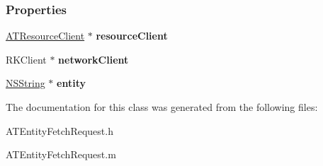 \subsubsection*{Properties}
\begin{DoxyCompactItemize}
\item 
\hypertarget{interface_a_t_entity_fetch_request_a187e3721b09b66577b6d2feba7ec0a4a}{
\hyperlink{interface_a_t_resource_client}{ATResourceClient} $\ast$ {\bfseries resourceClient}}
\label{interface_a_t_entity_fetch_request_a187e3721b09b66577b6d2feba7ec0a4a}

\item 
\hypertarget{interface_a_t_entity_fetch_request_ab59eb37b5bd6a386573c0ef591cad967}{
RKClient $\ast$ {\bfseries networkClient}}
\label{interface_a_t_entity_fetch_request_ab59eb37b5bd6a386573c0ef591cad967}

\item 
\hypertarget{interface_a_t_entity_fetch_request_afab560a9170c08b33c098f15b4399c01}{
\hyperlink{class_n_s_string}{NSString} $\ast$ {\bfseries entity}}
\label{interface_a_t_entity_fetch_request_afab560a9170c08b33c098f15b4399c01}

\end{DoxyCompactItemize}


The documentation for this class was generated from the following files:\begin{DoxyCompactItemize}
\item 
ATEntityFetchRequest.h\item 
ATEntityFetchRequest.m\end{DoxyCompactItemize}
